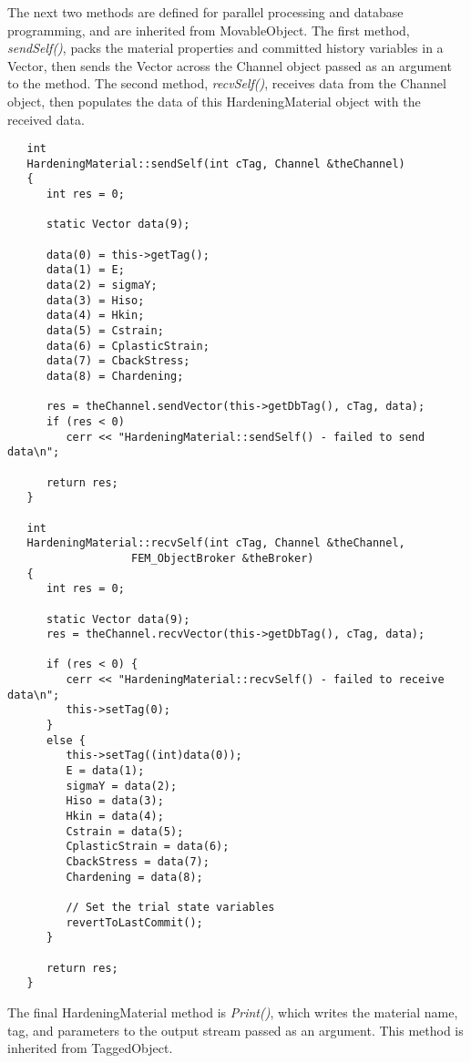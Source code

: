 \documentclass[12pt]{article}
\begin{document}
\noindent The next two methods are defined for parallel processing and database programming,
and are inherited from MovableObject.
The first method, {\em sendSelf()}, packs the material properties and committed history variables
in a Vector, then sends the Vector across the Channel object passed as an argument to the
method. The second method, {\em recvSelf()}, receives data from the Channel object, then populates
the data of this HardeningMaterial object with the received data.

{\sf\small
\begin{verbatim}
   int 
   HardeningMaterial::sendSelf(int cTag, Channel &theChannel)
   {
      int res = 0;
  
      static Vector data(9);
  
      data(0) = this->getTag();
      data(1) = E;
      data(2) = sigmaY;
      data(3) = Hiso;
      data(4) = Hkin;
      data(5) = Cstrain;
      data(6) = CplasticStrain;
      data(7) = CbackStress;
      data(8) = Chardening;
  
      res = theChannel.sendVector(this->getDbTag(), cTag, data);
      if (res < 0) 
         cerr << "HardeningMaterial::sendSelf() - failed to send data\n";

      return res;
   }

   int 
   HardeningMaterial::recvSelf(int cTag, Channel &theChannel, 
	               FEM_ObjectBroker &theBroker)
   {
      int res = 0;
  
      static Vector data(9);
      res = theChannel.recvVector(this->getDbTag(), cTag, data);
  
      if (res < 0) {
         cerr << "HardeningMaterial::recvSelf() - failed to receive data\n";
         this->setTag(0);      
      }
      else {
         this->setTag((int)data(0));
         E = data(1);
         sigmaY = data(2);
         Hiso = data(3);
         Hkin = data(4);
         Cstrain = data(5);
         CplasticStrain = data(6);
         CbackStress = data(7);
         Chardening = data(8);

         // Set the trial state variables
         revertToLastCommit();
      }
    
      return res;
   }
\end{verbatim}
}

\noindent The final HardeningMaterial method is {\em Print()}, which writes the material
name, tag, and parameters to the output stream passed as an argument. This method is
inherited from TaggedObject.
\end{document}
